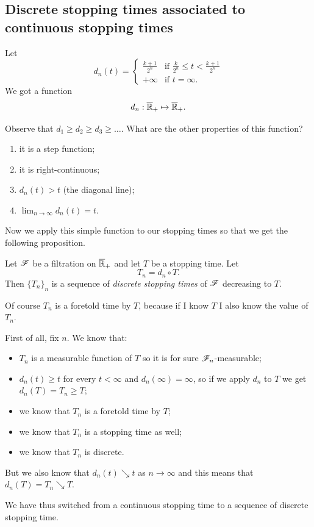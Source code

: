 \documentclass{report}
\begin{document}
\subsection{Discrete stopping times associated to continuous stopping times}
\begin{definition}
	Let
	\begin{equation*}
		d_n(t)=\begin{cases}
			\frac{k+1}{2^{n}}&\text{if }\frac{k}{2^{n}}\leq t <\frac{k+1}{2^{n}}\\
			+\infty &\text{if }t=\infty.
		\end{cases}
	\end{equation*}
	We got a function
	\[d_n:\overline{\mathbb{R}}_+\mapsto\overline{\mathbb{R}}_+.\]
\end{definition}
Observe that $d_1\geq d_2\geq d_3\geq\ldots$. What are the other properties of this function?
\begin{enumerate}
	\item it is a step function;
	\item it is right-continuous;
	\item $d_n(t)>t$ (the diagonal line);
	\item $\lim_{n\to\infty}d_n(t)=t$.
\end{enumerate}
Now we apply this simple function to our stopping times so that we get the following proposition.
\begin{proposition}
	Let $\mathscr{F}$ be a filtration on $\overline{\mathbb{R}}_+$ and let $T$ be a stopping time. Let 
	\[T_n=d_n\circ T.\]
	Then ${\{T_n\}}_{n}$ is a sequence of \emph{discrete stopping times} of $\mathscr{F}$ decreasing to $T$.
\end{proposition}
	Of course $T_n$ is a foretold time by $T$, because if I know $T$ I also know the value of $T_n$.
	\begin{fancyproof}
		First of all, fix $n$. We know that:
		\begin{itemize}
			\item $T_{n}$ is a measurable function of $T$ so it is for sure $\mathscr{F}_{n}$-measurable;
			\item $d_{n}(t)\geq t$ for every $t<\infty$ and $d_{n}(\infty)=\infty$, so if we apply $d_{n}$ to $T$ we get $d_{n}(T)=T_{n}\geq T$;
			\item we know that $T_{n}$ is a foretold time by $T$;
			\item we know that $T_{n}$ is a stopping time as well;
			\item we know that $T_{n}$ is discrete.
		\end{itemize}
		But we also know that $d_{n}(t)\searrow t$ as $n\to\infty$ and this means that $d_{n}(T)=T_{n}\searrow T$. 
	\end{fancyproof}
	We have thus switched from a continuous stopping time to a sequence of discrete stopping time.
\end{document}
